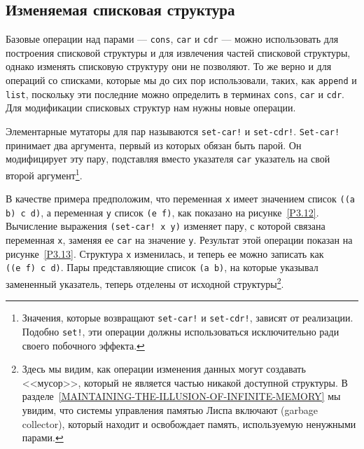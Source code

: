 \subsection{Изменяемая списковая структура}
\label{MUTABLE-LIST-STRUCTURE}


Базовые операции над парами --- {\tt cons},
{\tt car} и {\tt cdr} --- можно использовать для
построения списковой структуры и для извлечения частей списковой
структуры, однако изменять списковую структуру они не позволяют.  То же
верно и для операций со списками, которые мы до сих пор использовали,
таких, как {\tt append} и {\tt list}, поскольку эти
последние можно определить в терминах {\tt cons},
{\tt car} и {\tt cdr}.  Для модификации списковых
структур нам нужны новые операции.

%
%
%
%
Элементарные мутаторы для пар называются
{\tt set-car!} и {\tt set-cdr!}.  {\tt Set-car!}
принимает два аргумента, первый из которых обязан быть парой.  Он
модифицирует эту пару, подставляя вместо указателя {\tt car}
указатель на свой второй аргумент\footnote{%
%
Значения, которые возвращают {\tt set-car!} и
{\tt set-cdr!}, зависят от реализации.  Подобно
{\tt set!}, эти операции должны использоваться исключительно
ради своего побочного эффекта.}.

В качестве примера предположим, что переменная
{\tt x} имеет значением список {\tt ((a b) c
d)}, а переменная {\tt y} список {\tt (e f)}, как
показано на рисунке~\ref{P3.12}.  Вычисление выражения
{\tt (set-car! x y)} изменяет пару, с которой связана
переменная {\tt x}, заменяя ее {\tt car} на значение
{\tt y}.  Результат этой операции показан на
рисунке~\ref{P3.13}.  Структура {\tt x} изменилась, и теперь
ее можно записать как {\tt ((e~f)~c~d)}.  Пары %
представляющие список {\tt (a b)}, на которые указывал замененный
указатель, теперь отделены от исходной структуры\footnote{ Здесь мы видим, как операции изменения данных могут
создавать <<мусор>>, который не является частью никакой доступной
структуры.  
В разделе~\ref{MAINTAINING-THE-ILLUSION-OF-INFINITE-MEMORY} мы
увидим, что системы управления памятью Лиспа включают
 (garbage collector), который находит и
освобождает память, используемую ненужными парами.}.

